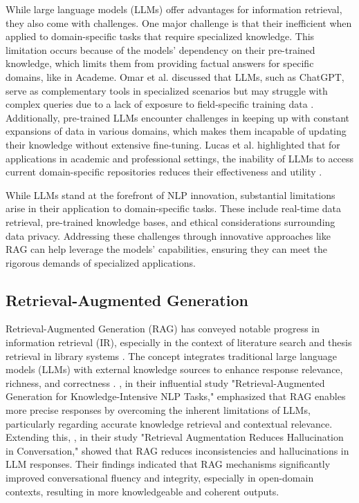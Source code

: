 \begin{refsection}
\newpage
\clearpage
\hspace{0.4cm}While large language models (LLMs) offer advantages for information retrieval, they also come with challenges. One major challenge is that their inefficient when applied to domain-specific tasks that require specialized knowledge. This limitation occurs because of the models' dependency on their pre-trained knowledge, which limits them from providing factual answers for specific domains, like in Academe. Omar et al. discussed that LLMs, such as ChatGPT, serve as complementary tools in specialized scenarios but may struggle with complex queries due to a lack of exposure to field-specific training data \cite{khraisha2024can}. Additionally, pre-trained LLMs encounter challenges in keeping up with constant expansions of data in various domains, which makes them incapable of updating their knowledge without extensive fine-tuning. Lucas et al. highlighted that for applications in academic and professional settings, the inability of LLMs to access current domain-specific repositories reduces their effectiveness and utility \cite{gartlehner2023data}.


\bigbreak
\hspace{0.4cm}While LLMs stand at the forefront of NLP innovation, substantial limitations arise in their application to domain-specific tasks. These include real-time data retrieval, pre-trained knowledge bases, and ethical considerations surrounding data privacy. Addressing these challenges through innovative approaches like RAG can help leverage the models' capabilities, ensuring they can meet the rigorous demands of specialized applications.


\subsection{Retrieval-Augmented Generation}

\hspace{1cm}Retrieval-Augmented Generation (RAG) has conveyed notable progress in information retrieval (IR), especially in the context of literature search and thesis retrieval in library systems \cite{thomo2024pubmed}. The concept integrates traditional large language models (LLMs) with external knowledge sources to enhance response relevance, richness, and correctness \cite{chen2024benchmarking}.
\newpage   
\clearpage
\citeauthor{lewis2020retrieval} \citeyear{lewis2020retrieval}, in their influential study "Retrieval-Augmented Generation for Knowledge-Intensive NLP Tasks," emphasized that RAG enables more precise responses by overcoming the inherent limitations of LLMs, particularly regarding accurate knowledge retrieval and contextual relevance. Extending this, \citeauthor{shuster2021retrieval} \citeyear{shuster2021retrieval}, in their study "Retrieval Augmentation Reduces Hallucination in Conversation," showed that RAG reduces inconsistencies and hallucinations in LLM responses. Their findings indicated that RAG mechanisms significantly improved conversational fluency and integrity, especially in open-domain contexts, resulting in more knowledgeable and coherent outputs.


\end{refsection}
